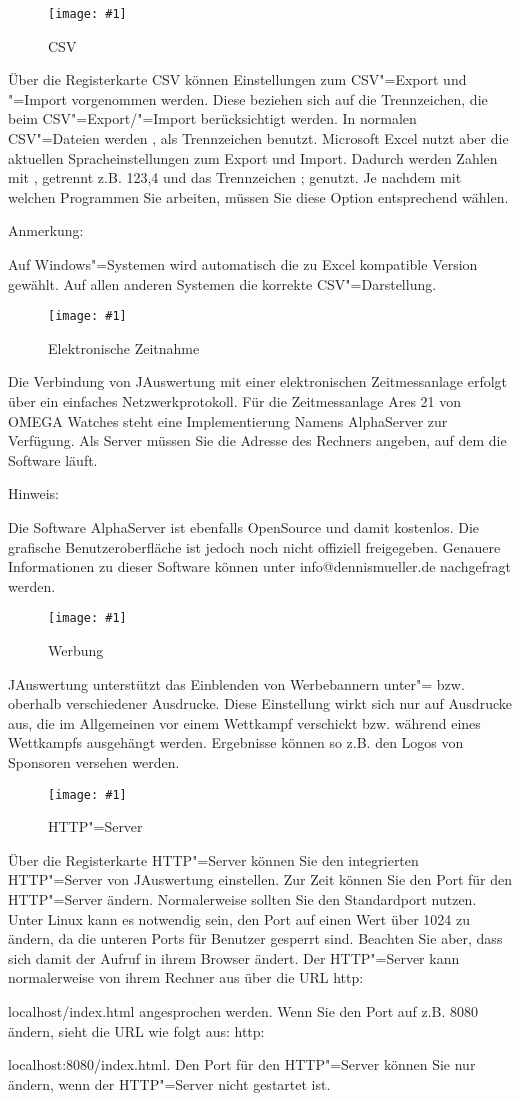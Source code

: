 \documentclass[11pt,a4paper,twoside,ngerman]{article}
\newcommand{\hsmimage}[3]{\begin{figure}[!ht]\centering\texttt{[image: \#1]}\caption{#3}\end{figure}}
\begin{document}
\hsmimage{pics/optionen-csv}{.51\textwidth}{CSV}
Über die Registerkarte \glqq{}CSV\grqq{} können Einstellungen zum CSV"=Export und "=Import vorgenommen werden. Diese beziehen sich auf die Trennzeichen, die beim CSV"=Export/"=Import berücksichtigt werden. In normalen CSV"=Dateien werden \glqq{},\grqq{} als Trennzeichen benutzt. Microsoft Excel nutzt aber die aktuellen Spracheinstellungen zum Export und Import. Dadurch werden Zahlen mit \glqq{},\grqq{} getrennt z.B. \glqq{}123,4\grqq{} und das Trennzeichen \glqq{};\grqq{} genutzt. Je nachdem mit welchen Programmen Sie arbeiten, müssen Sie diese Option entsprechend wählen.

\begin{bfseries}Anmerkung:\end{bfseries} Auf Windows"=Systemen wird automatisch die zu Excel kompatible Version gewählt. Auf allen anderen Systemen die korrekte CSV"=Darstellung.


\hsmimage{pics/optionen-elektronische-zeitnahme}{.66\textwidth}{Elektronische Zeitnahme}
Die Verbindung von JAuswertung mit einer elektronischen Zeitmessanlage erfolgt über ein einfaches Netzwerkprotokoll. Für die Zeitmessanlage \glqq{}Ares 21\grqq{} von \glqq{}OMEGA Watches\grqq{} steht eine Implementierung Namens \glqq{}AlphaServer\grqq{} zur Verfügung. Als Server müssen Sie die Adresse des Rechners angeben, auf dem die Software läuft. 

\begin{bfseries}Hinweis:\end{bfseries} Die Software \glqq{}AlphaServer\grqq{} ist ebenfalls OpenSource und damit kostenlos. Die grafische Benutzeroberfläche ist jedoch noch nicht offiziell freigegeben. Genauere Informationen zu dieser Software können unter info@dennismueller.de nachgefragt werden.


\hsmimage{pics/optionen-werbung}{.66\textwidth}{Werbung}
JAuswertung unterstützt das Einblenden von Werbebannern unter"= bzw. oberhalb verschiedener Ausdrucke. Diese Einstellung wirkt sich nur auf Ausdrucke aus, die im Allgemeinen vor einem Wettkampf verschickt bzw. während eines Wettkampfs ausgehängt werden. Ergebnisse können so z.B. den Logos von Sponsoren versehen werden.


\hsmimage{pics/optionen-http-server}{.66\textwidth}{HTTP"=Server}
Über die Registerkarte \glqq{}HTTP"=Server\grqq{} können Sie den integrierten HTTP"=Server von JAuswertung einstellen.  Zur Zeit können Sie den Port für den HTTP"=Server ändern. Normalerweise sollten Sie den Standardport nutzen. Unter Linux kann es notwendig sein, den Port auf einen Wert über 1024 zu ändern, da die unteren Ports für Benutzer gesperrt sind. Beachten Sie aber, dass sich damit der Aufruf in ihrem Browser ändert. Der HTTP"=Server kann normalerweise von ihrem Rechner aus über die URL \glqq{}http:\begin{itshape}localhost/index.html\grqq{} angesprochen werden. Wenn Sie den Port auf z.B. 8080 ändern, sieht die URL wie folgt aus: \glqq{}http:\end{itshape}localhost:8080/index.html\grqq{}. Den Port für den HTTP"=Server können Sie nur ändern, wenn der HTTP"=Server nicht gestartet ist.
\end{document}
